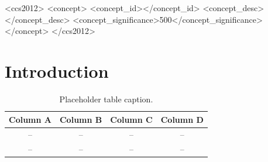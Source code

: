 \documentclass[manuscript,screen,review]{acmart}
\begin{document}
\title{}

\author{}
\email{}
\orcid{}
\affiliation{%
  \institution{}
  \city{}
  \state{}
  \country{}
}

\renewcommand{\shortauthors}{}

\begin{abstract}

\end{abstract}

\begin{CCSXML}
<ccs2012>
 <concept>
  <concept_id></concept_id>
  <concept_desc></concept_desc>
  <concept_significance>500</concept_significance>
 </concept>
</ccs2012>
\end{CCSXML}
\ccsdesc[500]{}

\keywords{}

\maketitle

\section{Introduction}
\label{sec:intro}

\begin{table}[H]
  \caption{Placeholder table caption.}
  \label{tab:placeholder}
  \begin{tabular}{cccc}
    \toprule
    Column A & Column B & Column C & Column D \\
    \midrule
    -- & -- & -- & -- \\
    -- & -- & -- & -- \\
    \bottomrule
  \end{tabular}
\end{table}
\end{document}
